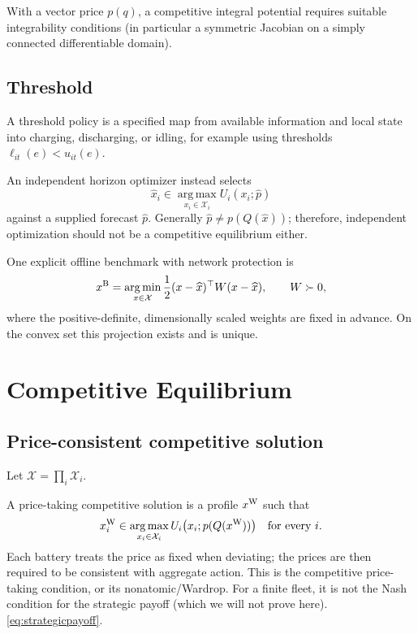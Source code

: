 \documentclass[11pt]{article}
\theoremstyle{remark}
\newcommand{\X}{\mathcal X}
\newcommand{\argmax}{\operatorname*{arg\,max}}
\newcommand{\argmin}{\operatorname*{arg\,min}}
\begin{document}
With a vector price $p(q)$, a competitive integral potential requires suitable
integrability conditions (in particular a symmetric Jacobian on a simply
connected differentiable domain).

\subsection{Threshold}
A threshold policy is a specified map from available information and local
state into charging, discharging, or idling, for example using thresholds
$\ell_{it}(e)<u_{it}(e)$. 

An independent horizon optimizer instead selects
\begin{equation}
 \widehat x_i\in\argmax_{x_i\in\X_i}U_i(x_i;\widehat p)
 \label{eq:independent}
\end{equation}
against a supplied  forecast $\widehat p$. Generally
$\widehat p\ne p(Q(\widehat x))$; therefore, independent optimization should not be
a competitive equilibrium either.

One explicit
offline benchmark with network protection is
\begin{equation}
 x^{\rm B}=\argmin_{x\in\X}
       \frac12(x-\widehat x)^\top W(x-\widehat x),\qquad W\succ0,
 \label{eq:projection}
\end{equation}
where the positive-definite, dimensionally scaled weights are fixed in advance.
On the convex set this projection exists and is unique.

\section{Competitive Equilibrium}
\label{sec:competitive}

\subsection{ Price-consistent competitive solution}

 Let $\X=\prod_i\X_i$.
 
A price-taking competitive solution is a profile $x^{\rm W}$ such that
\begin{equation}
 x_i^{\rm W}\in\argmax_{x_i\in\X_i}
       U_i\big(x_i;p(Q(x^{\rm W}))\big)
 \quad\text{for every }i.
 \label{eq:competitivefixedpoint}
\end{equation}
Each battery treats the price as fixed when deviating; the prices are then
required to be consistent with aggregate action. This is the competitive
price-taking condition, or its nonatomic/Wardrop. For a finite
fleet, it is not the Nash condition for the strategic payoff (which we will not prove here).
\eqref{eq:strategicpayoff}.
\end{document}

